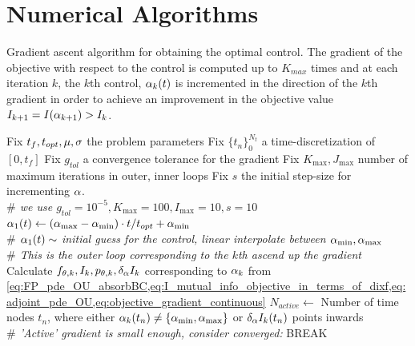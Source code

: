 \section{Numerical Algorithms}
\begin{algorithm}
\begin{algorithmic}
\caption{Gradient ascent algorithm for obtaining the optimal control.
The gradient of the objective with respect to the control is computed up to
$K_{max}$ times and at each iteration $k$, the $k$th control, $\alpha_k(t)$ is incremented in
the direction of the $k$th gradient in order to achieve an improvement in the
objective value $I_{k+1}  = I(\alpha_{k+1}) > I_k$.}
\label{alg:gradient_ascent_4_OC}
\State Fix $t_f, t_{opt}, {\mu }, \sigma$ the problem parameters
\State Fix $\{t_n\}_0^{N_t}$ a time-discretization of $[0,t_f]$
\State Fix $g_{tol}$ a convergence tolerance for the gradient
\State Fix $K_{\max}, J_{\max}$ number of maximum iterations in outer, inner
loops
\State Fix $s$ the initial step-size for incrementing $\alpha$. 
\\ {\itshape $\#$ we use $g_{tol}=10^{-5},K_{\max}=100,I_{\max}=10,s=10$}
\State $\alpha_1(t) \gets ({ \alpha_{\textrm{max}} }-{ \alpha_{\textrm{min}} }) \cdot t / t_{opt} + { \alpha_{\textrm{min}} }$ 
\\{\itshape  $\#$ $\alpha_1(t) \sim$ initial guess for the control, linear
interpolate between ${ \alpha_{\textrm{min}} }, { \alpha_{\textrm{max}} }$}
\\ {\itshape $\#$ This is the outer loop corresponding to the $k$th ascend up
the gradient} \State Calculate $f_{{ \theta},k},I_{k},p_{{ \theta},k}, \delta_\alpha I_k$ corresponding to $\alpha_k$ from
	\cref{eq:FP_pde_OU_absorbBC,eq:I_mutual_info_objective_in_terms_of_dixf,eq:adjoint_pde_OU,eq:objective_gradient_continuous}
	\State $N_{active}\gets$   Number of time nodes $t_n$, where either
	$\alpha_k(t_n) \neq \{{ \alpha_{\textrm{min}} }, { \alpha_{\textrm{max}} }\}$ or $\delta_\alpha I_k(t_n)$ points inwards
		  \\ {\itshape  $\#$ 'Active' gradient is small enough,
		 consider converged:}
		 \State BREAK
	\EndIf
{}
\end{algorithmic}
\end{algorithm}
